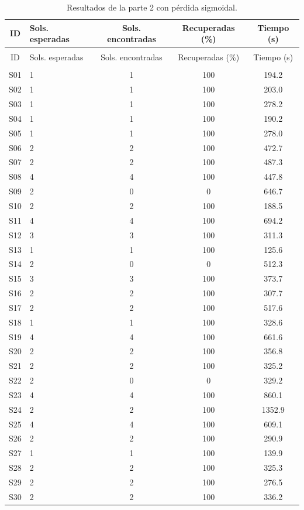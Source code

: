 \documentclass{article} \usepackage[utf8]{inputenc} \usepackage[spanish]{babel} \usepackage{amsmath, amssymb, amsthm} \usepackage{bm} \usepackage{float} \usepackage{longtable} \usepackage[hidelinks]{hyperref} \spanishdecimal{.}
\begin{document}
\begin{longtable}{clccc} \caption{Resultados de la parte 2 con pérdida sigmoidal.}
\label{tab:resultados_sigmoid_sistemas} \\
\hline
ID & Sols. esperadas & Sols. encontradas & Recuperadas (\%) & Tiempo (s) \\
\hline \endfirsthead
\multicolumn{5}{c}{\textit{}} \\
\hline
ID & Sols. esperadas & Sols. encontradas & Recuperadas (\%) & Tiempo (s) \\
\hline \endhead \hline
\multicolumn{5}{r}{\textit{}} \\
\endfoot \hline \endlastfoot
S01 & 1 & 1 & 100 & 194.2 \\
S02 & 1 & 1 & 100 & 203.0 \\
S03 & 1 & 1 & 100 & 278.2 \\
S04 & 1 & 1 & 100 & 190.2 \\
S05 & 1 & 1 & 100 & 278.0 \\
S06 & 2 & 2 & 100 & 472.7 \\
S07 & 2 & 2 & 100 & 487.3 \\
S08 & 4 & 4 & 100 & 447.8 \\
S09 & 2 & 0 & 0 & 646.7 \\
S10 & 2 & 2 & 100 & 188.5 \\
S11 & 4 & 4 & 100 & 694.2 \\
S12 & 3 & 3 & 100 & 311.3 \\
S13 & 1 & 1 & 100 & 125.6 \\
S14 & 2 & 0 & 0 & 512.3 \\
S15 & 3 & 3 & 100 & 373.7 \\
S16 & 2 & 2 & 100 & 307.7 \\
S17 & 2 & 2 & 100 & 517.6 \\
S18 & 1 & 1 & 100 & 328.6 \\
S19 & 4 & 4 & 100 & 661.6 \\
S20 & 2 & 2 & 100 & 356.8 \\
S21 & 2 & 2 & 100 & 325.2 \\
S22 & 2 & 0 & 0 & 329.2 \\
S23 & 4 & 4 & 100 & 860.1 \\
S24 & 2 & 2 & 100 & 1352.9 \\
S25 & 4 & 4 & 100 & 609.1 \\
S26 & 2 & 2 & 100 & 290.9 \\
S27 & 1 & 1 & 100 & 139.9 \\
S28 & 2 & 2 & 100 & 325.3 \\
S29 & 2 & 2 & 100 & 276.5 \\
S30 & 2 & 2 & 100 & 336.2 \\
\end{longtable}
\end{document}
